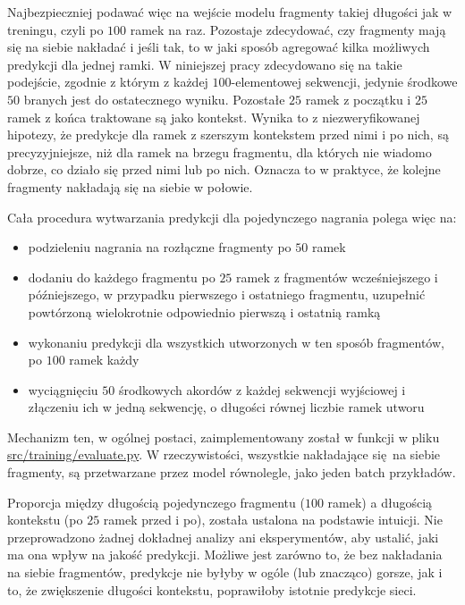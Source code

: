 Najbezpieczniej podawać więc na wejście modelu fragmenty takiej długości jak w treningu, czyli po $100$ ramek na raz. Pozostaje zdecydować, czy fragmenty mają się na siebie nakładać i jeśli tak, to w jaki sposób agregować kilka możliwych predykcji dla jednej ramki. W niniejszej pracy zdecydowano się na takie podejście, zgodnie z którym z każdej $100$-elementowej sekwencji, jedynie środkowe $50$ branych jest do ostatecznego wyniku. Pozostałe $25$ ramek z początku i $25$ ramek z końca traktowane są jako kontekst. Wynika to z niezweryfikowanej hipotezy, że predykcje dla ramek z szerszym kontekstem przed nimi i po nich, są precyzyjniejsze, niż dla ramek na brzegu fragmentu, dla których nie wiadomo dobrze, co działo się przed nimi lub po nich. Oznacza to w praktyce, że kolejne fragmenty nakładają się na siebie w połowie. 

Cała procedura wytwarzania predykcji dla pojedynczego nagrania polega więc na:
\begin{itemize}
    \item podzieleniu nagrania na rozłączne fragmenty po $50$ ramek
    \item dodaniu do każdego fragmentu po $25$ ramek z fragmentów wcześniejszego i późniejszego, w
        przypadku pierwszego i ostatniego fragmentu, uzupełnić powtórzoną wielokrotnie odpowiednio
        pierwszą i ostatnią ramką
    \item wykonaniu predykcji dla wszystkich utworzonych w ten sposób fragmentów, po $100$ ramek
        każdy
    \item wyciągnięciu $50$ środkowych akordów z każdej sekwencji wyjściowej i złączeniu ich w jedną
        sekwencję, o długości równej liczbie ramek utworu
\end{itemize}
Mechanizm ten, w ogólnej postaci, zaimplementowany został w funkcji  w pliku \url{src/training/evaluate.py}. W rzeczywistości, wszystkie nakładające się na siebie fragmenty, są przetwarzane przez model równolegle, jako jeden batch przykładów.

Proporcja między długością pojedynczego fragmentu ($100$ ramek) a długością kontekstu (po $25$ ramek przed i po), została ustalona na podstawie intuicji. Nie przeprowadzono żadnej dokładnej analizy ani eksperymentów, aby ustalić, jaki ma ona wpływ na jakość predykcji. Możliwe jest zarówno to, że bez nakładania na siebie fragmentów, predykcje nie byłyby w ogóle (lub znacząco) gorsze, jak i to, że zwiększenie długości kontekstu, poprawiłoby istotnie predykcje sieci.



